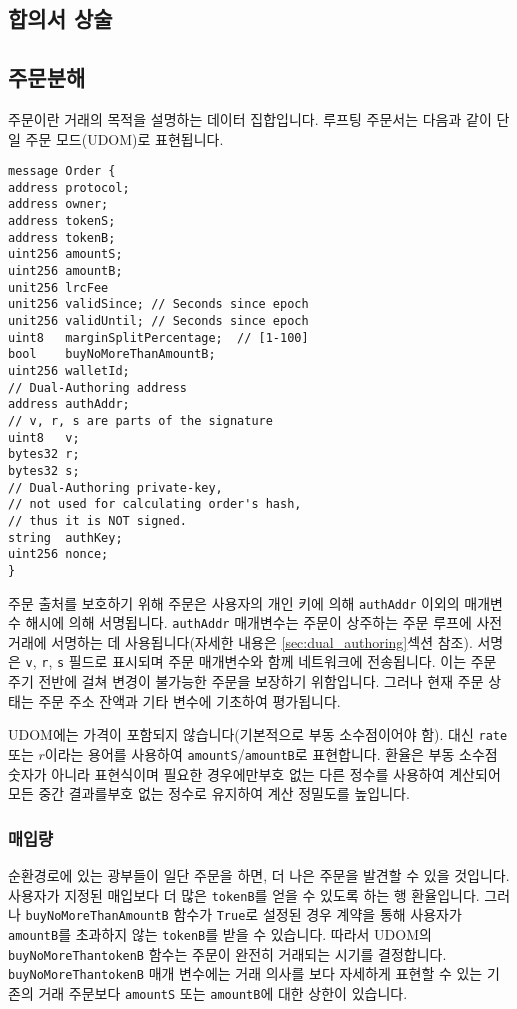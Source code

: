 \documentclass{article}
\begin{document}
\begin{multicols}{2}
\section{합의서 상술\label{sec:protocol}}

\subsection{주문분해\label{anatomy}}

\indent 주문이란 거래의 목적을 설명하는 데이터 집합입니다. 루프팅 주문서는 다음과 같이 단일 주문 모드(UDOM)로 표현됩니다.

\begin{verbatim}
message Order {
address protocol;
address owner;
address tokenS;
address tokenB;
uint256 amountS;
uint256 amountB;
unit256 lrcFee
unit256 validSince; // Seconds since epoch
unit256 validUntil; // Seconds since epoch
uint8   marginSplitPercentage;  // [1-100]
bool    buyNoMoreThanAmountB;
uint256 walletId;
// Dual-Authoring address
address authAddr;
// v, r, s are parts of the signature
uint8   v;       
bytes32 r;
bytes32 s;
// Dual-Authoring private-key,
// not used for calculating order's hash,
// thus it is NOT signed.
string  authKey;          
uint256 nonce;
}
\end{verbatim}


\indent 주문 출처를 보호하기 위해 주문은 사용자의 개인 키에 의해 \verb|authAddr| 이외의 매개변수 해시에 의해 서명됩니다. \verb|authAddr| 매개변수는 주문이 상주하는 주문 루프에 사전 거래에 서명하는 데 사용됩니다(자세한 내용은 \ref{sec:dual_authoring}섹션 참조). 서명은 \verb|v|, \verb|r|, \verb|s| 필드로 표시되며 주문 매개변수와 함께 네트워크에 전송됩니다. 이는 주문 주기 전반에 걸쳐 변경이 불가능한 주문을 보장하기 위함입니다. 그러나 현재 주문 상태는 주문 주소 잔액과 기타 변수에 기초하여 평가됩니다.



\indent UDOM에는 가격이 포함되지 않습니다(기본적으로 부동 소수점이어야 함). 대신 \verb|rate| 또는 $r$이라는 용어를 사용하여 \verb|amountS|/\verb|amountB|로 표현합니다. 환율은 부동 소수점 숫자가 아니라 표현식이며 필요한 경우에만부호 없는 다른 정수를 사용하여 계산되어 모든 중간 결과를부호 없는 정수로 유지하여  계산 정밀도를 높입니다.

\subsubsection{매입량}

\indent 순환경로에 있는 광부들이 일단 주문을 하면, 더 나은 주문을 발견할 수 있을 것입니다. 사용자가 지정된 매입보다 더 많은 \verb|tokenB|를 얻을 수 있도록 하는 행 환율입니다. 그러나 \verb|buyNoMoreThanAmountB| 함수가 \verb|True|로 설정된 경우 계약을 통해 사용자가 \verb|amountB|를 초과하지 않는 \verb|tokenB|를 받을 수 있습니다. 따라서 UDOM의 \verb|buyNoMoreThantokenB| 함수는 주문이 완전히 거래되는 시기를 결정합니다. \verb|buyNoMoreThantokenB| 매개 변수에는 거래 의사를 보다 자세하게 표현할 수 있는 기존의 거래 주문보다 \verb|amountS| 또는 \verb|amountB|에 대한 상한이 있습니다.


\end{multicols}
\end{document}
